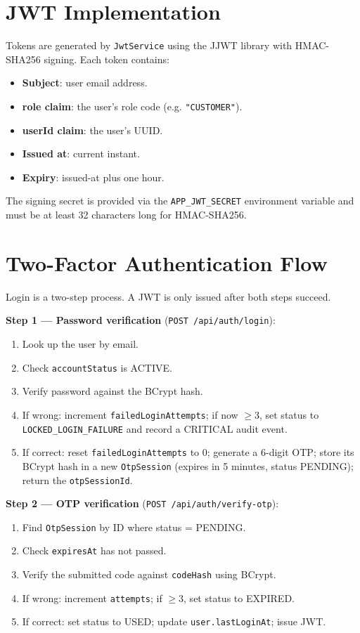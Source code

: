 \documentclass[12pt,a4paper]{report}
\begin{document}
\section{JWT Implementation}

Tokens are generated by \texttt{JwtService} using the JJWT library with HMAC-SHA256
signing. Each token contains:

\begin{itemize}[noitemsep]
  \item \textbf{Subject}: user email address.
  \item \textbf{role claim}: the user's role code (e.g. \texttt{"CUSTOMER"}).
  \item \textbf{userId claim}: the user's UUID.
  \item \textbf{Issued at}: current instant.
  \item \textbf{Expiry}: issued-at plus one hour.
\end{itemize}

The signing secret is provided via the \texttt{APP\_JWT\_SECRET} environment variable
and must be at least 32 characters long for HMAC-SHA256.

\section{Two-Factor Authentication Flow}

Login is a two-step process. A JWT is only issued after both steps succeed.

\textbf{Step 1 — Password verification} (\texttt{POST /api/auth/login}):
\begin{enumerate}[noitemsep]
  \item Look up the user by email.
  \item Check \texttt{accountStatus} is ACTIVE.
  \item Verify password against the BCrypt hash.
  \item If wrong: increment \texttt{failedLoginAttempts}; if now $\geq 3$, set status
        to \texttt{LOCKED\_LOGIN\_FAILURE} and record a CRITICAL audit event.
  \item If correct: reset \texttt{failedLoginAttempts} to 0; generate a 6-digit OTP;
        store its BCrypt hash in a new \texttt{OtpSession} (expires in 5 minutes,
        status PENDING); return the \texttt{otpSessionId}.
\end{enumerate}

\textbf{Step 2 — OTP verification} (\texttt{POST /api/auth/verify-otp}):
\begin{enumerate}[noitemsep]
  \item Find \texttt{OtpSession} by ID where status = PENDING.
  \item Check \texttt{expiresAt} has not passed.
  \item Verify the submitted code against \texttt{codeHash} using BCrypt.
  \item If wrong: increment \texttt{attempts}; if $\geq 3$, set status to EXPIRED.
  \item If correct: set status to USED; update \texttt{user.lastLoginAt}; issue JWT.
\end{enumerate}
\end{document}
